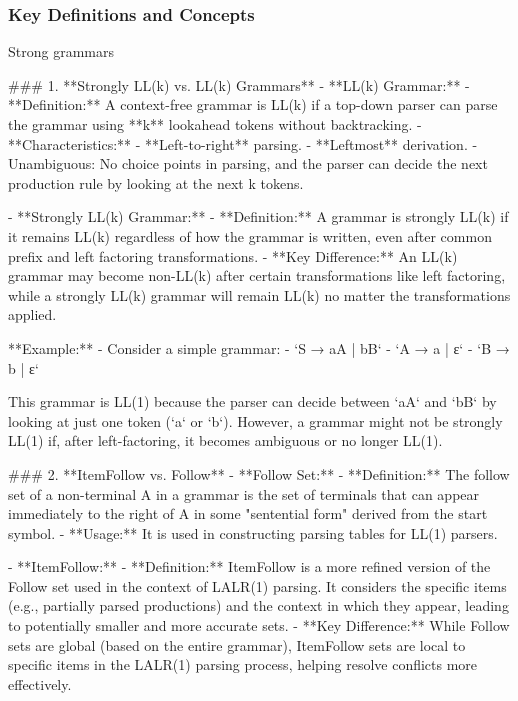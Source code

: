 \subsubsection{Key Definitions and Concepts}
Strong grammars













### 1. **Strongly LL(k) vs. LL(k) Grammars**
- **LL(k) Grammar:**
  - **Definition:** A context-free grammar is LL(k) if a top-down parser can parse the grammar using **k** lookahead tokens without backtracking.
  - **Characteristics:**
    - **Left-to-right** parsing.
    - **Leftmost** derivation.
    - Unambiguous: No choice points in parsing, and the parser can decide the next production rule by looking at the next k tokens.

- **Strongly LL(k) Grammar:**
  - **Definition:** A grammar is strongly LL(k) if it remains LL(k) regardless of how the grammar is written, even after common prefix and left factoring transformations.
  - **Key Difference:** An LL(k) grammar may become non-LL(k) after certain transformations like left factoring, while a strongly LL(k) grammar will remain LL(k) no matter the transformations applied.

**Example:**
- Consider a simple grammar:
  - `S → aA | bB`
  - `A → a | ε`
  - `B → b | ε`

  This grammar is LL(1) because the parser can decide between `aA` and `bB` by looking at just one token (`a` or `b`). However, a grammar might not be strongly LL(1) if, after left-factoring, it becomes ambiguous or no longer LL(1).


### 2. **ItemFollow vs. Follow**
- **Follow Set:**
  - **Definition:** The follow set of a non-terminal A in a grammar is the set of terminals that can appear immediately to the right of A in some "sentential form" derived from the start symbol.
  - **Usage:** It is used in constructing parsing tables for LL(1) parsers.

- **ItemFollow:**
  - **Definition:** ItemFollow is a more refined version of the Follow set used in the context of LALR(1) parsing. It considers the specific items (e.g., partially parsed productions) and the context in which they appear, leading to potentially smaller and more accurate sets.
  - **Key Difference:** While Follow sets are global (based on the entire grammar), ItemFollow sets are local to specific items in the LALR(1) parsing process, helping resolve conflicts more effectively.

